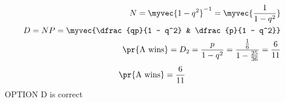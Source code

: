     \begin{align}
        N = \myvec{1 - q^2}^{-1} = \myvec{\dfrac{1}{1-q^2}}\\
        D = NP = \myvec{\dfrac{qp}{1 - q^2} & \dfrac{p}{1 - q^2}}\\
        \pr{\text{A wins}} = D_2 = \dfrac{p}{1 - q^2} = \frac{\frac{1}{6}}{1 - \frac{25}{36}} = \dfrac{6}{11}
    \end{align}
        \centering
\[
    \pr{\text{A wins}} = \dfrac{6}{11}
\]
OPTION D is correct